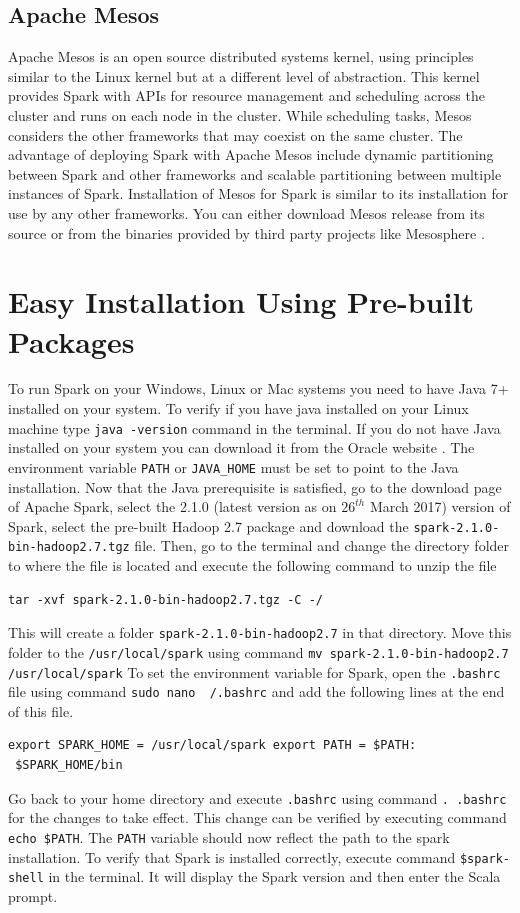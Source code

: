\documentclass[9pt,twocolumn,twoside]{../../styles/osajnl}
\begin{document}
\subsection{Apache Mesos}
Apache Mesos is an open source distributed systems kernel, using
principles similar to the Linux kernel but at a different level of
abstraction. This kernel provides Spark with APIs for resource
management and scheduling across the cluster and runs on each node in
the cluster. While scheduling tasks, Mesos considers the other
frameworks that may coexist on the same cluster. The advantage of
deploying Spark with Apache Mesos include dynamic partitioning between
Spark and other frameworks and scalable partitioning between multiple
instances of Spark. Installation of Mesos for Spark is similar to its
installation for use by any other frameworks. You can either download
Mesos release from its source or from the binaries provided by third
party projects like Mesosphere \cite{www-clusters}.

\section{Easy Installation Using Pre-built Packages}
To run Spark on your Windows, Linux or Mac systems you need to have
Java 7+ installed on your system. To verify if you have java installed
on your Linux machine type \texttt{java -version} command in the
terminal.  If you do not have Java installed on your system you can
download it from the Oracle website \cite{www-oracle}. The environment
variable \texttt{PATH} or \texttt{JAVA\_}\texttt{HOME} must be set to
point to the Java installation.  Now that the Java prerequisite is
satisfied, go to the download page of Apache Spark, select the 2.1.0
(latest version as on $26^{th}$ March 2017) version of Spark, select
the pre-built Hadoop 2.7 package and download the
\texttt{spark-2.1.0-bin-hadoop2.7.tgz} file. Then, go to the terminal
and change the directory folder to where the file is located and
execute the following command to unzip the file
\begin{verbatim}
tar -xvf spark-2.1.0-bin-hadoop2.7.tgz -C -/
\end{verbatim}
This will create a folder \texttt{spark-2.1.0-bin-hadoop2.7} in that
directory. Move this folder to the \texttt{/usr/local/spark} using
command \texttt{mv spark-2.1.0-bin-hadoop2.7 /usr/local/spark} To set
the environment variable for Spark, open the \texttt{.bashrc} file
using command \texttt{sudo nano ~/.bashrc} and add the following lines
at the end of this file.
\begin{verbatim}
export SPARK_HOME = /usr/local/spark export PATH = $PATH:
 $SPARK_HOME/bin
\end{verbatim}
Go back to your home directory and execute \texttt{.bashrc} using
command \texttt{. .bashrc} for the changes to take effect. This change
can be verified by executing command \texttt{echo \$PATH}. The
\texttt{PATH} variable should now reflect the path to the spark
installation. To verify that Spark is installed correctly, execute
command \texttt{\$spark-shell} in the terminal. It will display the
Spark version and then enter the Scala prompt.
\end{document}

